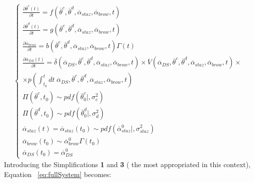 \begin{equation}
\label{eq:fullSystem}
\begin{split}
\left\{\begin{matrix}
\frac{\partial  \overline{\theta}^{c}\left ( t \right )}{\partial t}=f\left ( \overline{\theta}^{c},\overline{\theta}^{d}, \overline{\alpha}_{staz} ,\overline{\alpha}_{brow},      t \right ) \\
\frac{\partial  \overline{\theta}^{d}\left ( t \right )}{\partial t}=g\left ( \overline{\theta}^{c},\overline{\theta}^{d},\overline{\alpha}_{staz},\overline{\alpha}_{brow},t \right )\\
\frac{\partial \overline{\alpha}_{brow} }{\partial t}=b\left ( \overline{\theta}^{c},\overline{\theta}^{d},\overline{\alpha}_{staz},\overline{\alpha}_{brow},t \right )\Gamma \left ( t \right ) \\
\frac{\partial  \overline{\alpha }_{DS}\left ( t \right )}{\partial t}=  \overline{\delta}\left ( \overline{\alpha }_{DS}, \overline{\theta}^{c},\overline{\theta}^{d},\overline{\alpha}_{staz},\overline{\alpha}_{brow},t \right ) \times \overline{V}\left ( \overline{\alpha }_{DS}, \overline{\theta}^{c},\overline{\theta}^{d},\overline{\alpha}_{staz},\overline{\alpha}_{brow},t \right ) \times
\\ \times  \overline{p}\left ( \int_{t_{0}}^{t}  dt\;   \overline{\alpha }_{DS}, \overline{\theta}^{c},\overline{\theta}^{d},
  \overline{ \alpha}_{staz},\overline{\alpha}_{brow},t \right )
\\
\Pi \left ( \overline{\theta}^{c},t_{0} \right ) \sim pdf\left ( \overline{\theta}^{c}_{0}|,\sigma_{c}^{2} \right )\\
\Pi \left ( \overline{\theta}^{d},t_{0} \right ) \sim pdf\left ( \overline{\theta}^{d}_{0}|,\sigma_{d}^{2} \right ) \\
\overline{\alpha}_{staz}\left ( t \right )=\overline{\alpha}_{staz}\left ( t_{0} \right ) \sim pdf\left ( \overline{\alpha}_{staz}^{0}|, \sigma_{staz}^{2} \right ) \\
\overline{\alpha}_{brow}\left ( t_{0} \right ) \sim  \overline{\alpha}_{brow}^{0} \Gamma \left ( t_{0} \right ) \\
\overline{\alpha}_{DS} \left ( t_{0} \right ) = \overline{\alpha}_{DS} ^{0}
\end{matrix}\right.
\end{split}
\end{equation}
Introducing the Simplifications \textbf{1} and \textbf{3} ( the most
appropriated in this context), Equation ~\ref{eq:fullSystem} becomes:
